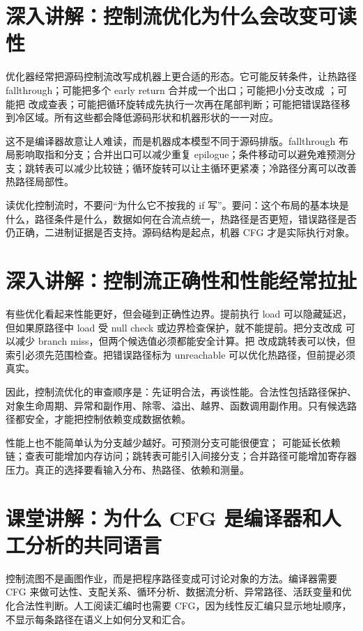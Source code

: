 \section{深入讲解：控制流优化为什么会改变可读性}

优化器经常把源码控制流改写成机器上更合适的形态。它可能反转条件，让热路径 fallthrough；可能把多个 early return 合并成一个出口；可能把小分支改成 ；可能把  改成查表；可能把循环旋转成先执行一次再在尾部判断；可能把错误路径移到冷区域。所有这些都会降低源码形状和机器形状的一一对应。

这不是编译器故意让人难读，而是机器成本模型不同于源码排版。fallthrough 布局影响取指和分支；合并出口可以减少重复 epilogue；条件移动可以避免难预测分支；跳转表可以减少比较链；循环旋转可以让主循环更紧凑；冷路径分离可以改善热路径局部性。

读优化控制流时，不要问“为什么它不按我的 if 写”。要问：这个布局的基本块是什么，路径条件是什么，数据如何在合流点统一，热路径是否更短，错误路径是否仍正确，二进制证据是否支持。源码结构是起点，机器 CFG 才是实际执行对象。

\section{深入讲解：控制流正确性和性能经常拉扯}

有些优化看起来性能更好，但会碰到正确性边界。提前执行 load 可以隐藏延迟，但如果原路径中 load 受 null check 或边界检查保护，就不能提前。把分支改成  可以减少 branch miss，但两个候选值必须都能安全计算。把  改成跳转表可以快，但索引必须先范围检查。把错误路径标为 unreachable 可以优化热路径，但前提必须真实。

因此，控制流优化的审查顺序是：先证明合法，再谈性能。合法性包括路径保护、对象生命周期、异常和副作用、除零、溢出、越界、函数调用副作用。只有候选路径都安全，才能把控制依赖变成数据依赖。

性能上也不能简单认为分支越少越好。可预测分支可能很便宜； 可能延长依赖链；查表可能增加内存访问；跳转表可能引入间接分支；合并路径可能增加寄存器压力。真正的选择要看输入分布、热路径、依赖和测量。

\section{课堂讲解：为什么 CFG 是编译器和人工分析的共同语言}

控制流图不是画图作业，而是把程序路径变成可讨论对象的方法。编译器需要 CFG 来做可达性、支配关系、循环分析、数据流分析、异常路径、活跃变量和优化合法性判断。人工阅读汇编时也需要 CFG，因为线性反汇编只显示地址顺序，不显示每条路径在语义上如何分叉和汇合。

